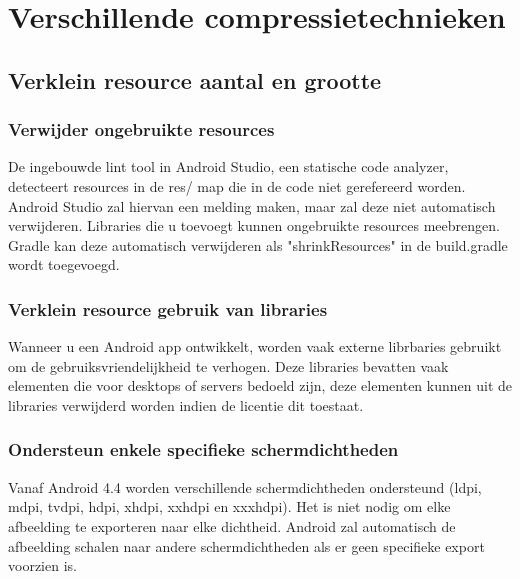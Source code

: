 \section{Verschillende compressietechnieken} \cite{googlereduceapksize}
\label{sec:compressietechnieken}

\subsection{Verklein resource aantal en grootte}
\label{sec:reduceresources}

\subsubsection{Verwijder ongebruikte resources}
\label{sec:removeunusedresources}
De ingebouwde lint tool in Android Studio, een statische code analyzer, detecteert resources in de res/ map die in de code niet gerefereerd worden. Android Studio zal hiervan een melding maken, maar zal deze niet automatisch verwijderen. Libraries die u toevoegt kunnen ongebruikte resources meebrengen. Gradle kan deze automatisch verwijderen als "shrinkResources" in de build.gradle wordt toegevoegd. 

\subsubsection{Verklein resource gebruik van libraries}
\label{sec:minimizeresourceslibraries}
Wanneer u een Android app ontwikkelt, worden vaak externe librbaries gebruikt om de gebruiksvriendelijkheid te verhogen. Deze libraries bevatten vaak elementen die voor desktops of servers bedoeld zijn, deze elementen kunnen uit de libraries verwijderd worden indien de licentie dit toestaat.

\subsubsection{Ondersteun enkele specifieke schermdichtheden }
\label{sec:supportspecificdensities}
Vanaf Android 4.4 worden verschillende schermdichtheden ondersteund (ldpi, mdpi, tvdpi, hdpi, xhdpi, xxhdpi en xxxhdpi). Het is niet nodig om elke afbeelding te exporteren naar elke dichtheid. Android zal automatisch de afbeelding schalen naar andere schermdichtheden als er geen specifieke export voorzien is. 

